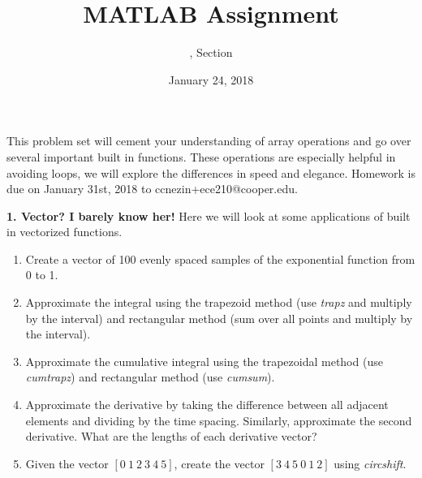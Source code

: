 \documentclass[11pt]{article}
\title{MATLAB Assignment \Homework}
\author{\Session, Section \Section}
\date{January 24, 2018}
\makeatletter
\def\MyEmail{ccnezin+ece210@cooper.edu}
\def\DateOfSubmission{January 31st, 2018 }
\newenvironment{qparts}{\begin{enumerate}[{(}a{)}]}{\end{enumerate}}
\makeatother
\begin{document}
\maketitle
This problem set will cement your understanding of array operations and go over several important built in functions.  These operations are especially helpful in avoiding loops, we will explore the differences in speed and elegance. Homework is due on \DateOfSubmission  to \MyEmail. 

 \noindent \textbf{1. Vector? I barely know her!} Here we will look at some applications of built in vectorized functions.
 \begin{qparts}
  \item Create a vector of 100 evenly spaced samples of the exponential function from 0 to 1.
  \item Approximate the integral using the trapezoid method (use \emph{trapz} and multiply by the interval) and rectangular method (sum over all points and multiply by the interval).
  \item Approximate the cumulative integral using the trapezoidal method (use \emph{cumtrapz}) and rectangular method (use \emph{cumsum}).

  \item Approximate the derivative by taking the difference between all adjacent elements and dividing by the time spacing. Similarly, approximate the second derivative.  What are the lengths of each derivative vector?
  \item Given the vector $[0\ 1\ 2\ 3\ 4\ 5]$, create the vector $[3\ 4\ 5\ 0\ 1\ 2]$ using \emph{circshift}.
 \end{qparts}
\end{document}
